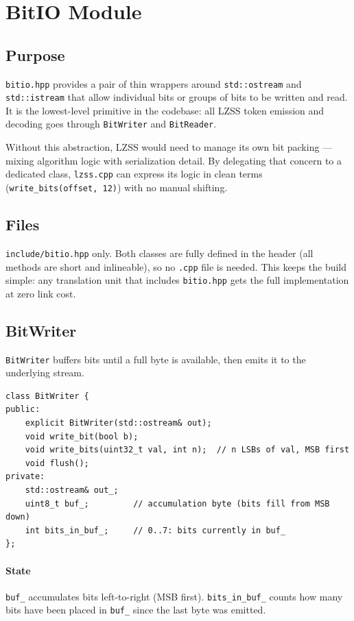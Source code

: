 \section{BitIO Module}

\subsection{Purpose}

\texttt{bitio.hpp} provides a pair of thin wrappers around \texttt{std::ostream} and
\texttt{std::istream} that allow individual bits or groups of bits to be written and read.
It is the lowest-level primitive in the codebase: all LZSS token emission and decoding
goes through \texttt{BitWriter} and \texttt{BitReader}.

Without this abstraction, LZSS would need to manage its own bit packing --- mixing algorithm
logic with serialization detail.
By delegating that concern to a dedicated class, \texttt{lzss.cpp} can express its logic
in clean terms (\texttt{write\_bits(offset, 12)}) with no manual shifting.

\subsection{Files}

\texttt{include/bitio.hpp} only.
Both classes are fully defined in the header (all methods are short and inlineable),
so no \texttt{.cpp} file is needed.
This keeps the build simple: any translation unit that includes \texttt{bitio.hpp}
gets the full implementation at zero link cost.

\subsection{BitWriter}

\texttt{BitWriter} buffers bits until a full byte is available, then emits it to the
underlying stream.

\begin{lstlisting}[style=cpp]
class BitWriter {
public:
    explicit BitWriter(std::ostream& out);
    void write_bit(bool b);
    void write_bits(uint32_t val, int n);  // n LSBs of val, MSB first
    void flush();
private:
    std::ostream& out_;
    uint8_t buf_;         // accumulation byte (bits fill from MSB down)
    int bits_in_buf_;     // 0..7: bits currently in buf_
};
\end{lstlisting}

\paragraph{State}
\texttt{buf\_} accumulates bits left-to-right (MSB first).
\texttt{bits\_in\_buf\_} counts how many bits have been placed in \texttt{buf\_} since
the last byte was emitted.


